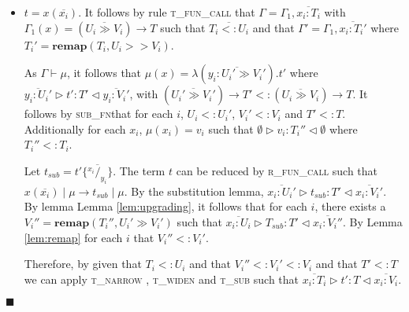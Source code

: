 \documentclass{article}
\newcommand{\lemref}[1]{Lemma \ref{#1}}
\newcommand{\rseqlt}{\textsc{r\_seq\_left\_term} }
\newcommand{\rseqlv}{\textsc{r\_seq\_left\_value} }
\newcommand{\rfunc}{\textsc{r\_fun\_call} }
\newcommand{\tseq}{\textsc{t\_seq} }
\newcommand{\tfunc}{\textsc{t\_fun\_call} }
\newcommand{\tsub}{\textsc{t\_sub} }
\newcommand{\tnarrow}{\textsc{t\_narrow} }
\newcommand{\twiden}{\textsc{t\_widen} }
\newcommand{\subfn}{\textsc{sub\_fn}}
\newcommand{\remapapp}[3]{\ensuremath{\mathbf{remap}(#1, #2 \gg #3)}}
\newcommand{\typerule}[4]{#1 \triangleright #2 : #3 \triangleleft #4}
\newcommand{\subst}[3]{#3 \{\overline{^{#1}/_{#2}}\}}
\newcommand{\funv}[4]{\lambda(\overline{#1 : #2 \gg #3}).#4}
\newcommand{\funt}[3]{(\overline{#1 \gg #2}) \rightarrow #3}
\newcommand{\qed}{$\blacksquare$}
\newenvironment{proof}{\vspace{1ex}\noindent{\bf Proof}\hspace{0.5em}}
  {\hfill\qed\vspace{1ex}}
\begin{document}
\begin{proof}
\begin{itemize}
	\begin{itemize}
	\item If $t_l$ is some value $v$, then
	reduction can occur by \\ 
	\rseqlv such that
	$t_l; t_r \mid \mu \longrightarrow t_r \mu$. By \lemref{lem:valuectx}, 
	$\Gamma'' = \Gamma = \Gamma_{mid}$
	and $\mu' = \mu$, therefore $\Gamma'' \vdash \mu'$ and 
	$\typerule{\Gamma''}{t_r}{T}{\Gamma'}$.

	\item If $t_l$ is a term, by induction $t_l \mid \mu \longrightarrow t_l' \mid \mu'$
	with some $\Gamma'' \vdash \mu'$ and
	$\typerule{\Gamma''}{t_l'}{T_l}{\Gamma_{mid}}$.
	This satisfies the requirements of \rseqlt
	such that $t_l; t_r \mid \mu \longrightarrow t_l'; t_r \mid \mu'$.
	Additionally, the requirements of \tseq are satisfied such that
	$\typerule{\Gamma''}{t_l'; t_r}{T}{\Gamma'}$.

	\end{itemize}

\item $t = x ( \overline{x_i} )$. It follows by rule \tfunc that
$\Gamma = \Gamma_1, \overline{x_i : T_i}$ 
with $\Gamma_1(x) = \funt{U_i}{V_i}{T}$
such that $\overline{T_i <: U_i}$ 
and that $\Gamma' = \Gamma_1, \overline{x_i : T_i'}$
where $T_i' = \mathbf{remap} ( T_i, U_i >> V_i )$.

As $\Gamma \vdash \mu$, 
it follows that $\mu(x) = \funv{y_i}{U_i'}{V_i'}{t'}$
where $\typerule{\overline{y_i : U_i'}}{t'}{T'}{\overline{y_i : V_i'}}$,
with $\funt{U_i'}{V_i'}{T'} <: \funt{U_i}{V_i}{T}$. It
follows by \subfn that for each $i$, $U_i <: U_i'$, $V_i' <: V_i$
and $T' <: T$.
Additionally for each $x_i$, $\mu(x_i) = v_i$ such that 
$\typerule{\emptyset}{v_i}{T_i''}{\emptyset}$ 
where $T_i'' <: T_i$.

Let $t_{sub} = \subst{x_i}{y_i}{t'}$.
The term $t$ can be reduced by \rfunc such that
$x ( \overline{x_i} ) \mid \mu \longrightarrow t_{sub} \mid \mu$.
By the substitution lemma, 
$\typerule{\overline{x_i : U_i'}}{t_{sub}}{T'}{\overline{x_i : V_i'}}$.
By lemma \lemref{lem:upgrading}, it follows that
for each $i$, there exists a $V_i'' = \remapapp{T_i''}{U_i'}{V_i'}$
such that 
$\typerule{\overline{x_i : U_i}}{T_{sub}}{T'}{\overline{x_i : V_i''}}$.
By \lemref{lem:remap} for each $i$ that $V_i'' <: V_i'$.

Therefore, by given that $T_i <: U_i$ and that $V_i'' <: V_i' <: V_i$
and that $T' <: T$ we can apply \tnarrow, \twiden and \tsub
such that $\typerule{\overline{x_i : T_i}}{t'}{T}{\overline{x_i : V_i}}$.


\end{itemize}
\end{proof}
\end{document}
